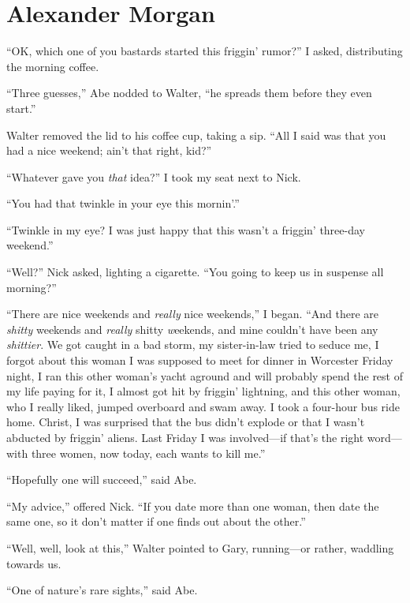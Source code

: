 \chapter{Alexander Morgan}

\titlemark

\hspace*{\parindent}

``OK, which one of you bastards started this friggin' rumor?'' I asked,
distributing the morning coffee.

``Three guesses,'' Abe nodded to Walter, ``he spreads them before they
even start.''

Walter removed the lid to his coffee cup, taking a sip. ``All I said was
that you had a nice weekend; ain't that right, kid?''

``Whatever gave you \emph{that} idea?'' I took my seat next to Nick.

``You had that twinkle in your eye this mornin'.''

``Twinkle in my eye? I was just happy that this wasn't a friggin'
three-day weekend.''

``Well?'' Nick asked, lighting a cigarette. ``You going to keep us in
suspense all morning?''

``There are nice weekends and \emph{really} nice weekends,'' I began.
``And there are \emph{shitty} weekends and \emph{really} shitty
\emph{w}eekends, and mine couldn't have been any \emph{shittier}. We got
caught in a bad storm, my sister-in-law tried to seduce me, I forgot
about this woman I was supposed to meet for dinner in Worcester Friday
night, I ran this other woman's yacht aground and will probably spend
the rest of my life paying for it, I almost got hit by friggin'
lightning, and this other woman, who I really liked, jumped overboard
and swam away. I took a four-hour bus ride home. Christ, I was surprised
that the bus didn't explode or that I wasn't abducted by friggin'
aliens. Last Friday I was involved---if that's the right word---with
three women, now today, each wants to kill me.''

``Hopefully one will succeed,'' said Abe.

``My advice,'' offered Nick. ``If you date more than one woman, then
date the same one, so it don't matter if one finds out about the
other.''

``Well, well, look at this,'' Walter pointed to Gary, running---or
rather, waddling towards us.

``One of nature's rare sights,'' said Abe.

